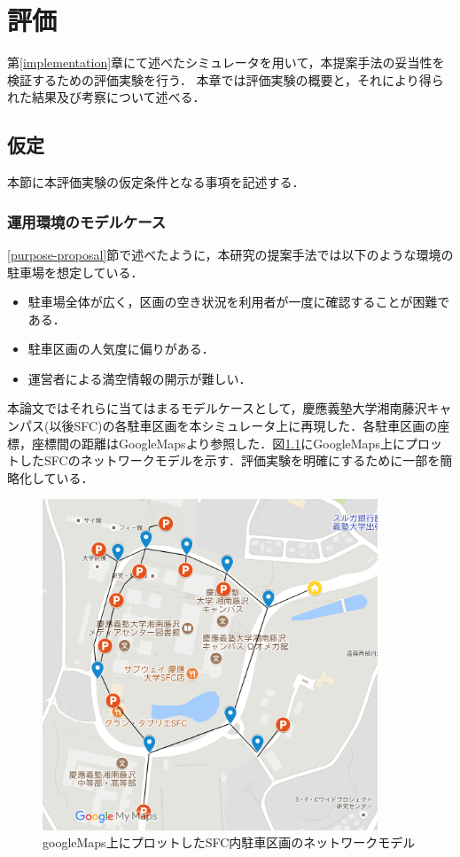 
\chapter{評価}
\label{evaluation}
第\ref{implementation}章にて述べたシミュレータを用いて，本提案手法の妥当性を検証するための評価実験を行う．
本章では評価実験の概要と，それにより得られた結果及び考察について述べる．
\section{仮定}
本節に本評価実験の仮定条件となる事項を記述する．

\subsection{運用環境のモデルケース}
\label{model-case}
\ref{purpose-proposal}節で述べたように，本研究の提案手法では以下のような環境の駐車場を想定している．
\begin{itemize}
	\item 駐車場全体が広く，区画の空き状況を利用者が一度に確認することが困難である．
	\item 駐車区画の人気度に偏りがある．
	\item 運営者による満空情報の開示が難しい．
\end{itemize}

本論文ではそれらに当てはまるモデルケースとして，慶應義塾大学湘南藤沢キャンパス(以後SFC)の各駐車区画を本シミュレータ上に再現した．各駐車区画の座標，座標間の距離はGoogleMaps\cite{googlemap}より参照した．図\ref{google-sfc}にGoogleMaps上にプロットしたSFCのネットワークモデルを示す．評価実験を明確にするために一部を簡略化している．

\begin{figure}
	\centering
	\includegraphics[width=10cm]{fig/google-map.png}
	\caption{googleMaps上にプロットしたSFC内駐車区画のネットワークモデル}
	\label{google-sfc}
\end{figure}



